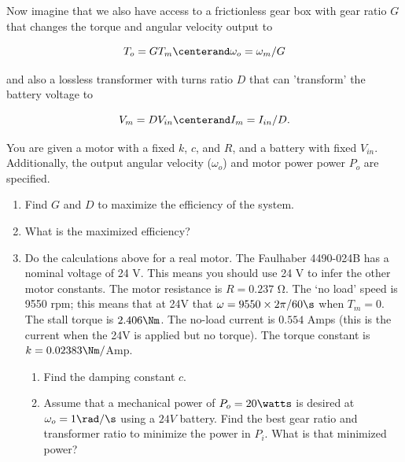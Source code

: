 \begin{enumerate}
Now imagine that we also have access to a frictionless gear box with gear ratio $G$ that
changes the torque and angular velocity output to

\begin{equation}
T_{o} = G T_{m} \centerand \omega_{o} = \omega_{m}/G
\end{equation}

and also a lossless transformer with turns ratio $D$ that can 'transform' the battery
voltage to

\begin{equation}
V_{m}  =   D V_{in}  \centerand   I_{m} = I_{in}/D.
\end{equation}

You are given a motor with a fixed $k$, $c$, and $R$, and a battery with fixed $V_{in}$. Additionally, the output angular velocity ($\omega_o$) and motor power power $P_o$ are specified.

\begin{enumerate}


\item Find  $G$ and $D$ to maximize the efficiency of the system. 

\item  What is the maximized efficiency?

\item   Do the calculations above for a real motor.  The Faulhaber
4490-024B has a nominal voltage of  24 V.  This means you should use
24 V to infer the other motor constants.  The motor resistance is $R = 0.237$ $\mathrm{\Omega}$.  The  `no load' speed is 9550 rpm; this means that at 24V that $\omega =
9550 \times 2\pi/ 60\s$ when $T_m = 0$.  The stall torque is $2.406\Nm$. 
The no-load current is $0.554$ Amps (this is the current when the 24V is applied but no torque).  The torque constant is $k =0.02383 \Nm/ $Amp.

\begin{enumerate}
\item  Find the damping constant $c$.

\item  Assume that a mechanical power of  $P_{o} = 20 \watts$ is desired
at $\omega_{o} = 1 \rad/\s$ using a $24 V$ battery.  Find the best gear ratio and transformer ratio to minimize the power in $P_{i}$.  What is that minimized power?

\end{enumerate}
\end{enumerate}
\end{enumerate}

